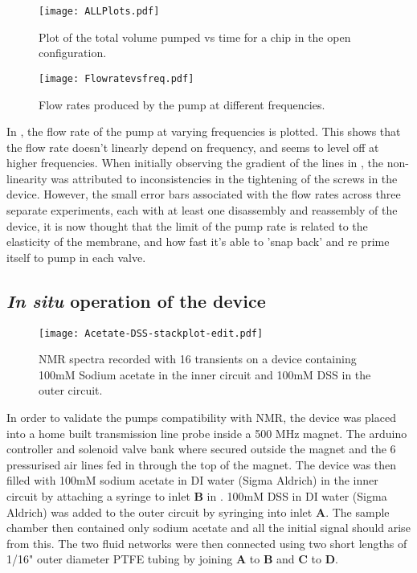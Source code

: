 \begin{figure}[h]
  \begin{center}
  \texttt{[image: ALLPlots.pdf]}
  \caption{Plot of the total volume pumped vs time for a chip in the open
  configuration.}
  \label{fig:Graph}
  \end{center}
\end{figure}

\begin{figure}[h]
  \begin{center}
  \texttt{[image: Flowratevsfreq.pdf]}
  \caption{Flow rates produced by the pump at different frequencies.}
  \label{fig:FRvFGraph}
  \end{center}
\end{figure}

In , the flow rate of the pump at varying frequencies is plotted. This
shows that the flow rate doesn't linearly depend on frequency, and seems to level off at higher
frequencies. When initially observing the gradient of the lines in , the non-
linearity was attributed to inconsistencies in the tightening of the screws in the device.
However, the small error bars associated with the flow rates across three separate
experiments, each with at least one disassembly and reassembly of the device, it is now thought that the limit of the
pump rate is related to the elasticity of the membrane, and how fast it's able to 'snap
back' and re prime itself to pump in each valve.

\subsection{\textit{In situ} operation of the device}

\begin{figure}[h]
  \begin{center}
  \texttt{[image: Acetate-DSS-stackplot-edit.pdf]}
  \caption{NMR spectra recorded with 16 transients on a device containing 100mM Sodium
  acetate in the inner circuit and 100mM DSS in the outer circuit.}
  \label{fig:spectra}
  \end{center}
\end{figure}

In order to validate the pumps compatibility with NMR, the device was placed into a home
built transmission line probe inside a 500 MHz magnet. The arduino controller and solenoid valve
bank where secured outside the magnet and the 6 pressurised air lines fed in through the top of
the magnet. The device was then filled with 100mM sodium acetate in DI water (Sigma Aldrich) in
the inner circuit by attaching a syringe to inlet \textbf{B} in . 100mM DSS in DI
water (Sigma Aldrich) was added to the outer circuit by syringing into inlet \textbf{A}. The sample chamber then contained only sodium acetate and all the initial signal should arise from this. The two fluid networks
were then connected using two short lengths of 1/16" outer diameter PTFE tubing by joining
\textbf{A} to \textbf{B} and \textbf{C} to \textbf{D}.


